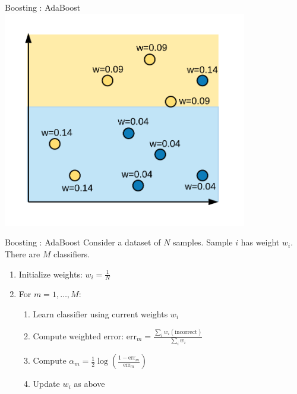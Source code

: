 \documentclass[aspectratio=169,10pt]{beamer}
\newcommand{\fitpic}[1]{\begin{adjustbox}{max width=\linewidth, max totalheight=0.78\textheight}#1\end{adjustbox}}
\begin{document}
\begin{frame}{Boosting : AdaBoost }
  \centering
  \fitpic{\includegraphics[width=0.8\textwidth]{../assets/ensemble/diagrams/ada_iter2_new_weights}}
\end{frame}

\begin{frame}{Boosting : AdaBoost }
  Consider a dataset of $N$ samples. Sample $i$ has weight $w_i$. There are $M$ classifiers.\\[0.3cm]
  \begin{enumerate}
    \item Initialize weights: $w_i = \frac{1}{N}$
    \item For $m = 1, \ldots, M$:
          \begin{enumerate}
            \item Learn classifier using current weights $w_i$
            \item Compute weighted error: $\text{err}_m = \frac{\sum_i w_i(\text{incorrect})}{\sum_i w_i}$
            \item Compute $\alpha_m = \tfrac{1}{2}\log\!\left(\frac{1 - \text{err}_m}{\text{err}_m}\right)$
            \item Update $w_i$ as above
          \end{enumerate}
  \end{enumerate}
\end{frame}
\end{document}
